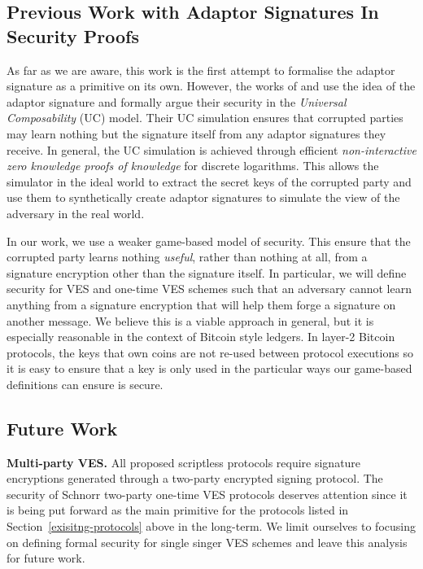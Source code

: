 \subsection{Previous Work with Adaptor Signatures In Security Proofs}

As far as we are aware, this work is the first attempt to formalise the adaptor signature as a primitive on its own. However, the works of \cite{cryptoeprint:2018:472} and \cite{cryptoeprint:2019:589} use the idea of the adaptor signature and formally argue their security in the \emph{Universal Composability} (UC) model\cite{UC}. Their UC simulation ensures that corrupted parties may learn nothing but the signature itself from any adaptor signatures they receive. In general, the UC simulation is achieved through efficient \emph{non-interactive zero knowledge proofs of knowledge} for discrete logarithms. This allows the simulator in the ideal world to extract the secret keys of the corrupted party and use them to synthetically create adaptor signatures to simulate the view of the adversary in the real world.

In our work, we use a weaker game-based model of security. This ensure that the corrupted party learns nothing \emph{useful}, rather than nothing at all, from a signature encryption other than the signature itself. In particular, we will define security for VES and one-time VES schemes such that an adversary cannot learn anything from a signature encryption that will help them forge a signature on another message. We believe this is a viable approach in general, but it is especially reasonable in the context of Bitcoin style ledgers. In layer-2 Bitcoin protocols, the keys that own coins are not re-used between protocol executions so it is easy to ensure that a key is only used in the particular ways our game-based definitions can ensure is secure.

\subsection{Future Work}

\textbf{Multi-party VES.} All proposed scriptless protocols require signature encryptions generated through a two-party encrypted signing protocol. The security of Schnorr two-party one-time VES protocols deserves attention since it is being put forward as the main primitive for the protocols listed in Section~\ref{exisitng-protocols} above in the long-term. We limit ourselves to focusing on defining formal security for single singer VES schemes and leave this analysis for future work.

